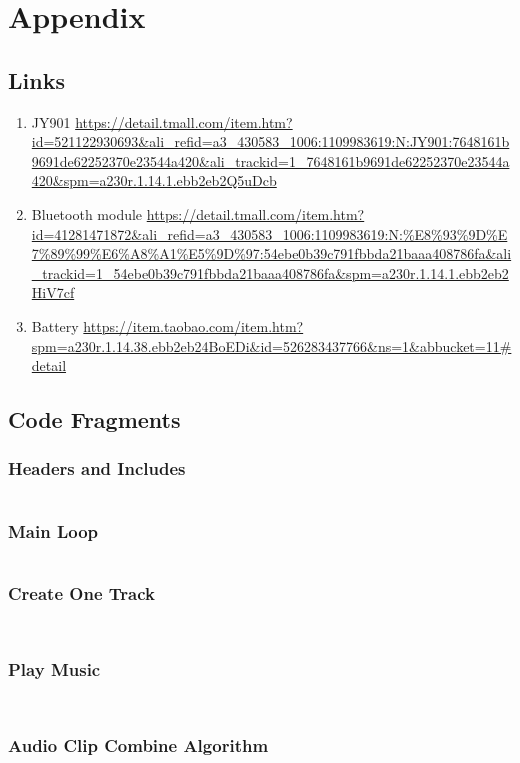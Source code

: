 \section{Appendix}

\subsection{Links}

\begin{enumerate}
\item JY901 
\url{https://detail.tmall.com/item.htm?id=521122930693&ali_refid=a3_430583_1006:1109983619:N:JY901:7648161b9691de62252370e23544a420&ali_trackid=1_7648161b9691de62252370e23544a420&spm=a230r.1.14.1.ebb2eb2Q5uDcb} 

\item  Bluetooth module 
\url{https://detail.tmall.com/item.htm?id=41281471872&ali_refid=a3_430583_1006:1109983619:N:%E8%93%9D%E7%89%99%E6%A8%A1%E5%9D%97:54ebe0b39c791fbbda21baaa408786fa&ali_trackid=1_54ebe0b39c791fbbda21baaa408786fa&spm=a230r.1.14.1.ebb2eb2HiV7cf}
\item  Battery 
\url{https://item.taobao.com/item.htm?spm=a230r.1.14.38.ebb2eb24BoEDi&id=526283437766&ns=1&abbucket=11#detail} 

\end{enumerate}

\newpage

\subsection{Code Fragments}

\subsubsection{Headers and Includes}
\inputminted{csharp}{scr/Headers.cs}


\subsubsection{Main Loop}
\inputminted{csharp}{scr/OnGui.cs}

\newpage

\subsubsection{Create One Track}
\inputminted{csharp}{scr/CreateOneTrack.cs}
\newpage
\inputminted{csharp}{scr/cot2.cs}


\subsubsection{Play Music}
\inputminted{csharp}{scr/PlayMusic.cs}
\newpage
\inputminted{csharp}{scr/pm2.cs}


\subsubsection{Audio Clip Combine Algorithm}
\inputminted{csharp}{scr/ACCombine.cs}
\newpage
\inputminted{csharp}{scr/acc2.cs}

